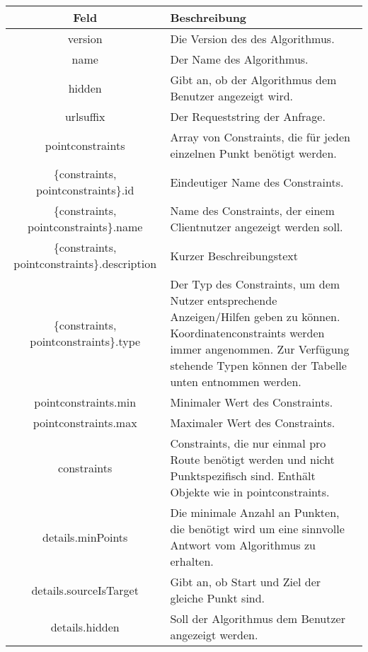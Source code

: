 \documentclass[ngerman,titlepage,parskip=true]{scrartcl}
\begin{document}
    \noindent \begin{tabular}{|c|p{10.5cm}|}
    	\hline
    	\textbf{Feld} & \textbf{Beschreibung} \\ 
    	\hline \hline
    	
    	version & Die Version des des Algorithmus. \\ 
    	\hline
    	
    	name & Der Name des Algorithmus. \\
    	\hline
    	
    	hidden & Gibt an, ob der Algorithmus dem Benutzer angezeigt wird. \\
    	\hline
    	
    	urlsuffix & Der Requeststring der Anfrage. \\
    	\hline
    	
    	pointconstraints & Array von Constraints, die für jeden einzelnen Punkt benötigt werden. \\
    	\hline
    	
    	\{constraints, pointconstraints\}.id & Eindeutiger Name des Constraints. \\
    	\hline
    	
    	\{constraints, pointconstraints\}.name & Name des Constraints, der einem Clientnutzer angezeigt werden soll. \\
    	\hline 
    	
    	\{constraints, pointconstraints\}.description & Kurzer Beschreibungstext \\
    	\hline
    	
    	\{constraints, pointconstraints\}.type & Der Typ des Constraints, um dem Nutzer entsprechende Anzeigen/Hilfen geben zu können. Koordinatenconstraints werden immer angenommen. Zur Verfügung stehende Typen können der Tabelle unten entnommen werden.\\ 
    	\hline
    	
    	pointconstraints.min & Minimaler Wert des Constraints. \\
    	\hline
    	
    	pointconstraints.max & Maximaler Wert des Constraints. \\
    	\hline
    	
    	constraints & Constraints, die nur einmal pro Route benötigt werden und nicht Punktspezifisch sind. Enthält Objekte wie in pointconstraints. \\
    	\hline
    	
    	details.minPoints & Die minimale Anzahl an Punkten, die benötigt wird um eine sinnvolle Antwort vom Algorithmus zu erhalten.\\ 
		\hline
		
		details.sourceIsTarget & Gibt an, ob Start und Ziel der gleiche Punkt sind.\\    		\hline    		
    	details.hidden & Soll der Algorithmus dem Benutzer angezeigt werden.\\ 
		\hline

   	\end{tabular}
   	
\end{document}
